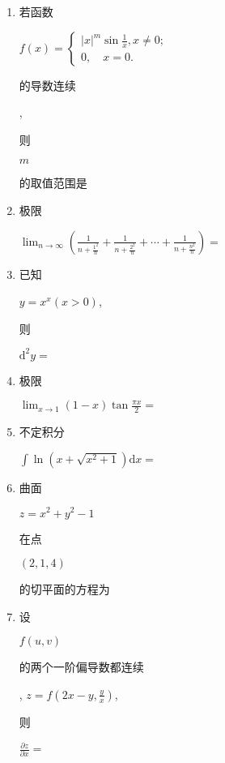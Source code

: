 \documentclass[10pt]{article}
\begin{document}
\begin{enumerate}
  \item \begin{CJK}{UTF8}{mj}若函数\end{CJK} $f(x)=\left\{\begin{array}{l}|x|^{m} \sin \frac{1}{x}, x \neq 0 ; \\ 0, \quad x=0 .\end{array}\right.$ \begin{CJK}{UTF8}{mj}的导数连续\end{CJK}, \begin{CJK}{UTF8}{mj}则\end{CJK} $m$ \begin{CJK}{UTF8}{mj}的取值范围是\end{CJK}

  \item \begin{CJK}{UTF8}{mj}极限\end{CJK} $\lim _{n \rightarrow \infty}\left(\frac{1}{n+\frac{1^{2}}{n}}+\frac{1}{n+\frac{2^{2}}{n}}+\cdots+\frac{1}{n+\frac{n^{2}}{n}}\right)=$

  \item \begin{CJK}{UTF8}{mj}已知\end{CJK} $y=x^{x}(x>0)$, \begin{CJK}{UTF8}{mj}则\end{CJK} $\mathrm{d}^{2} y=$

  \item \begin{CJK}{UTF8}{mj}极限\end{CJK} $\lim _{x \rightarrow 1}(1-x) \tan \frac{\pi x}{2}=$

  \item \begin{CJK}{UTF8}{mj}不定积分\end{CJK} $\int \ln \left(x+\sqrt{x^{2}+1}\right) \mathrm{d} x=$

  \item \begin{CJK}{UTF8}{mj}曲面\end{CJK} $z=x^{2}+y^{2}-1$ \begin{CJK}{UTF8}{mj}在点\end{CJK} $(2,1,4)$ \begin{CJK}{UTF8}{mj}的切平面的方程为\end{CJK}

  \item \begin{CJK}{UTF8}{mj}设\end{CJK} $f(u, v)$ \begin{CJK}{UTF8}{mj}的两个一阶偏导数都连续\end{CJK}, $z=f\left(2 x-y, \frac{y}{x}\right)$, \begin{CJK}{UTF8}{mj}则\end{CJK} $\frac{\partial z}{\partial x}=$


\end{enumerate}
\end{document}
